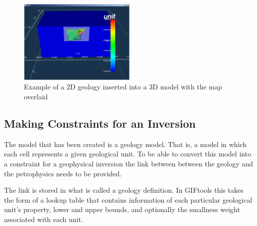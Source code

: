 \begin{figure} [h]
    \centering
    \includegraphics[width=0.5\textwidth]{images/MaptoModel/mapModelCross3D.PNG}
    \caption{Example of a 2D geology inserted into a 3D model with the map overlaid}
    \label{fig:mapModelCross3D}
\end{figure}
\FloatBarrier
\subsection{Making Constraints for an Inversion}
\label{subsec:Making Constraints for an Inversion}

The model that has been created is a geology model. That is, a model in which each cell represents a given geological unit. To be able to convert this model into a constraint for a geophysical inversion the link between between the geology and the petrophysics needs to be provided. 

The link is stored in what is called a geology definition. In GIFtools this takes the form of a lookup table that contains information of each particular geological unit's property, lower and upper bounds, and optionally the smallness weight associated with each unit. 

